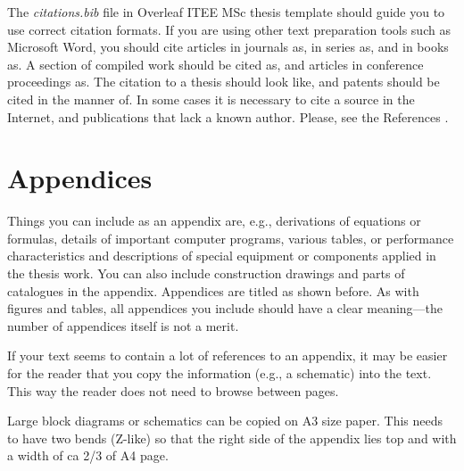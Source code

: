 The \textit{citations.bib} file in Overleaf ITEE MSc thesis template should guide you to use correct citation formats. \DIFaddbegin {}\DIFaddend If you are using other text preparation tools such as Microsoft Word, you should cite articles in journals  as\DIFaddbegin \DIFadd{~}\DIFaddend \cite{ojala:2002}, in series as\DIFaddbegin \DIFadd{~}\DIFaddend \cite{riekki:1998}, and in books as\DIFdelbegin {}\DIFdelend \DIFaddbegin {}\DIFaddend . A section of compiled work should be cited as\DIFaddbegin \DIFadd{~}\DIFaddend \cite{cvejic:2005}, and articles in conference proceedings as\DIFaddbegin \DIFadd{~}\DIFaddend \cite{heikkila:1997}. The citation to a thesis should look like\DIFaddbegin \DIFadd{~}\DIFaddend \cite{heikkinen:2011}, and patents should be cited in the manner of\DIFaddbegin \DIFadd{~}\DIFaddend \cite{toivonen:2004}. In some cases it is necessary to cite a source in the Internet\DIFdelbegin {}\DIFdelend \DIFaddbegin {}\DIFaddend , and publications that lack a known author\DIFdelbegin {}\DIFdelend \DIFaddbegin {}\DIFaddend . Please, see the References \DIFdelbegin {}\DIFdelend \DIFaddbegin {}\DIFaddend .

\section{Appendices}
\label{sec:appendices}
\DIFdelbegin %

\DIFdelend Things you can include as an appendix are, e.g., derivations of equations or formulas, details of important computer programs, various tables, or performance characteristics and descriptions of special equipment or components applied in the thesis work. You can also include construction drawings and parts of catalogues in the appendix. Appendices are titled as shown before. As with figures and tables, all appendices you include should have a clear meaning---the number of appendices itself is not a merit.

If your text seems to contain a lot of references to an appendix, it may be easier for the reader that you copy the information (e.g., a schematic) into the text. This way the reader does not need to browse between pages.

Large block diagrams or schematics can be copied on A3 size paper. This needs to have two bends (Z-like) so that the right side of the appendix lies top and with a width of ca 2/3 of A4 page.
